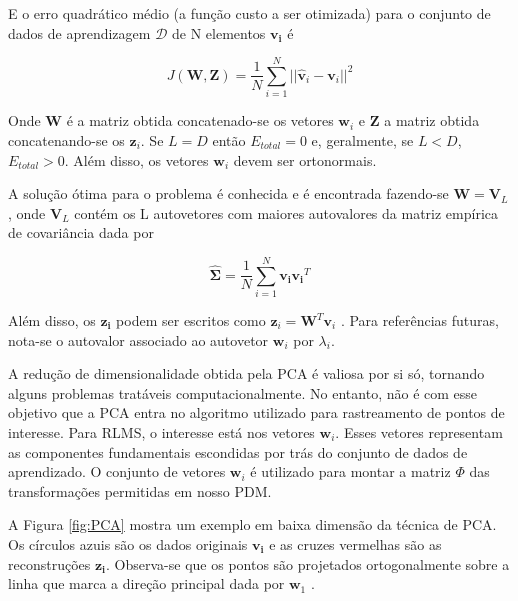 {E o erro quadrático médio (a função custo a ser otimizada) para o conjunto de
dados de aprendizagem $\mathcal{D}$ de N elementos $\mathbf{v_i}$ é

\begin{equation}
J(\mathbf{W}, \mathbf{Z} ) = \frac{1}{N}\sum_{i=1}^N ||\mathbf{\hat{v}}_{i} - \mathbf{v}_i||^2
\end{equation}

Onde $\mathbf{W}$ é a matriz obtida concatenado-se os vetores $\mathbf{w}_i$ e
$\mathbf{Z}$ a matriz obtida concatenando-se os $\mathbf{z}_i$. Se $L = D$ então
$E_{total} = 0$ e, geralmente, se $L < D$, $E_{total} > 0$.  Além disso, os
vetores $\mathbf{w}_i$ devem ser ortonormais.

A solução ótima para o problema é conhecida e é encontrada fazendo-se
$\mathbf{W} = \mathbf{V}_L$, onde $\mathbf{V}_L$ contém os L autovetores com
maiores autovalores da matriz empírica de covariância dada por 

\begin{equation}
\hat{\mathbf{\Sigma}} = \frac{1}{N}\sum_{i=1}^{N} \mathbf{v_i}\mathbf{v_i}^T
\end{equation}

Além disso, os $\mathbf{z_i}$ podem ser escritos como $\mathbf{z}_i =
\mathbf{W}^T \mathbf{v}_i$ \cite{machine-learning-book}. Para referências
futuras, nota-se o autovalor associado ao autovetor $\mathbf{w}_i$ por
$\lambda_i$.

A redução de dimensionalidade obtida pela PCA é valiosa por si só, tornando
alguns problemas tratáveis computacionalmente. No entanto, não é com esse
objetivo que a PCA entra no algoritmo utilizado para rastreamento de pontos de
interesse. Para  RLMS, o interesse está nos vetores $\mathbf{w}_i$. Esses
vetores representam as componentes fundamentais escondidas por trás do conjunto
de dados de aprendizado. O conjunto de vetores $\mathbf{w}_i$ é utilizado para
montar a matriz $\Phi$ das transformações permitidas em nosso PDM.

A Figura \ref{fig:PCA} mostra um exemplo em baixa dimensão da técnica de PCA. Os
círculos azuis são os dados originais $\mathbf{v_i}$ e as cruzes vermelhas são
as reconstruções $\mathbf{z_i}$. Observa-se que os pontos são projetados
ortogonalmente sobre a linha que marca a direção principal dada por
$\mathbf{w}_1$ \cite{machine-learning-book}.


}
